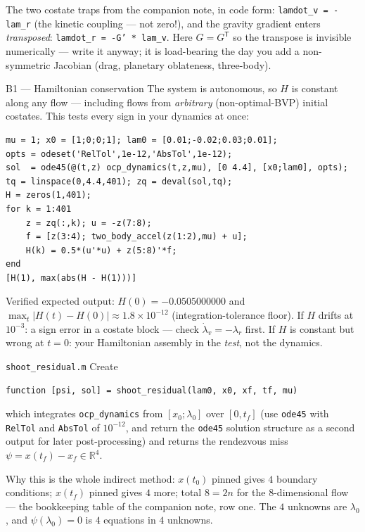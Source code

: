 \documentclass[11pt,letterpaper]{article}
\newcommand{\R}{\mathbb{R}}
\newcommand{\T}{^{\mathsf{T}}}
\begin{document}
\begin{hint}
The two costate traps from the companion note, in code form:
\texttt{lamdot\_v = -lam\_r} (the kinetic coupling --- not zero!), and the
gravity gradient enters \emph{transposed}: \texttt{lamdot\_r = -G' * lam\_v}.
Here $G = G\T$ so the transpose is invisible numerically --- write it anyway;
it is load-bearing the day you add a non-symmetric Jacobian (drag, planetary
oblateness, three-body).
\end{hint}

\begin{checkpoint}{B1 --- Hamiltonian conservation}
The system is autonomous, so $H$ is constant along any flow --- including
flows from \emph{arbitrary} (non-optimal-BVP) initial costates. This tests
every sign in your dynamics at once:
\begin{verbatim}
mu = 1; x0 = [1;0;0;1]; lam0 = [0.01;-0.02;0.03;0.01];
opts = odeset('RelTol',1e-12,'AbsTol',1e-12);
sol  = ode45(@(t,z) ocp_dynamics(t,z,mu), [0 4.4], [x0;lam0], opts);
tq = linspace(0,4.4,401); zq = deval(sol,tq);
H = zeros(1,401);
for k = 1:401
    z = zq(:,k); u = -z(7:8);
    f = [z(3:4); two_body_accel(z(1:2),mu) + u];
    H(k) = 0.5*(u'*u) + z(5:8)'*f;
end
[H(1), max(abs(H - H(1)))]
\end{verbatim}
Verified expected output: $H(0) = -0.0505000000$ and
$\max_t |H(t)-H(0)| \approx 1.8\times 10^{-12}$ (integration-tolerance
floor). If $H$ drifts at $10^{-3}$: a sign error in a costate block ---
check $\dot\lambda_v = -\lambda_r$ first. If $H$ is constant but wrong at
$t=0$: your Hamiltonian assembly in the \emph{test}, not the dynamics.
\end{checkpoint}

\begin{exercise}{\texttt{shoot\_residual.m}}
Create
\begin{verbatim}
function [psi, sol] = shoot_residual(lam0, x0, xf, tf, mu)
\end{verbatim}
which integrates \texttt{ocp\_dynamics} from $[x_0; \lambda_0]$ over
$[0, t_f]$ (use \texttt{ode45} with \texttt{RelTol} and \texttt{AbsTol} of
$10^{-12}$, and return the \texttt{ode45} solution structure as a second
output for later post-processing) and returns the rendezvous miss
$\psi = x(t_f) - x_f \in \R^4$.

Why this is the whole indirect method: $x(t_0)$ pinned gives $4$ boundary
conditions; $x(t_f)$ pinned gives $4$ more; total $8 = 2n$ for the
$8$-dimensional flow --- the bookkeeping table of the companion note, row
one. The $4$ unknowns are $\lambda_0$, and $\psi(\lambda_0) = 0$ is $4$
equations in $4$ unknowns.
\end{exercise}
\end{document}
